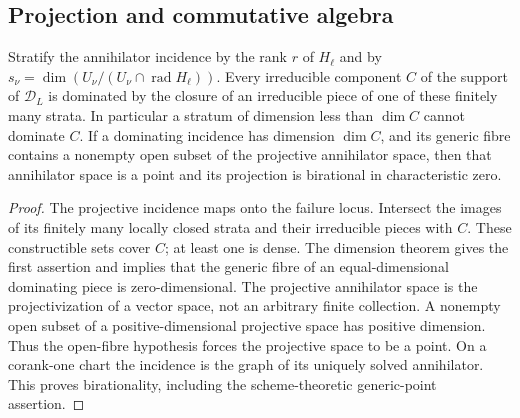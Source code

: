 \subsection{Projection and commutative algebra}
\begin{proposition}\label{prop:incidence-components}
Stratify the annihilator incidence by the rank $r$ of $H_\ell$ and by
$s_\nu=\dim(U_\nu/(U_\nu\cap\operatorname{rad}H_\ell))$.
Every irreducible component $C$ of the support of $\mathscr D_L$ is
dominated by the closure of an irreducible piece of one of these finitely
many strata. In particular a stratum of dimension less than $\dim C$
cannot dominate $C$.
If a dominating incidence has dimension $\dim C$, and its generic fibre
contains a nonempty open subset of the projective annihilator space,
then that annihilator space is a point and its projection is birational
in characteristic zero.
\end{proposition}
\begin{proof}
The projective incidence maps onto the failure locus. Intersect the
images of its finitely many locally closed strata and their irreducible
pieces with $C$. These constructible sets cover $C$; at least one is
dense. The dimension theorem gives the first assertion and implies that
the generic fibre of an equal-dimensional dominating piece is
zero-dimensional. The projective annihilator space is the projectivization
of a vector space, not an arbitrary finite collection. A nonempty open
subset of a positive-dimensional projective space has positive dimension.
Thus the open-fibre hypothesis forces the projective space to be a point.
On a corank-one chart the incidence is the graph of its uniquely solved
annihilator. This proves birationality, including the scheme-theoretic
generic-point assertion.
\end{proof}


